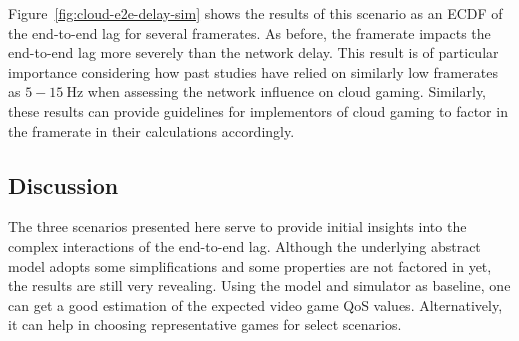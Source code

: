 Figure~\ref{fig:cloud-e2e-delay-sim} shows the results of this scenario as an \gls{ECDF} of the end-to-end lag for several framerates. As before, the framerate impacts the end-to-end lag more severely than the network delay.
This result is of particular importance considering how past studies have relied on similarly low framerates as $5-\SI{15}{\hertz}$ when assessing the network influence on cloud gaming. Similarly, these results can provide guidelines for implementors of cloud gaming to factor in the framerate in their calculations accordingly.


\subsection{Discussion}

The three scenarios presented here serve to provide initial insights into the complex interactions of the end-to-end lag. Although the underlying abstract model adopts some simplifications and some properties are not factored in yet, the results are still very revealing. Using the model and simulator as baseline, one can get a good estimation of the expected video game \gls{QoS} values. Alternatively, it can help in choosing representative games for select scenarios.







